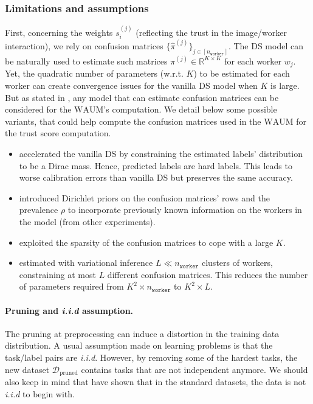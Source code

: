 \subsubsection{Limitations and assumptions}
First, concerning the weights $s_i^{(j)}$ (reflecting the trust in the image/worker interaction), we rely on confusion matrices $\{\hat{\pi}^{(j)}\}_{j\in [n_\texttt{worker}]}$.
The DS model \citep{dawid_maximum_1979} can be naturally used to estimate such matrices $\pi^{(j)}\in\mathbb{R}^{K\times K}$ for each worker $w_j$.
Yet, the quadratic number of parameters (w.r.t. $K$) to be estimated for each worker can create convergence issues for the vanilla DS model when $K$ is large.
But as stated in , any model that can estimate confusion matrices can be considered for the $\mathrm{WAUM}$'s computation.
We detail below some possible variants, that could help compute the confusion matrices used in the $\mathrm{WAUM}$ for the trust score computation.
\begin{itemize}
    \item \citet{sinha2018fast} accelerated the vanilla DS by constraining the estimated labels' distribution to be a Dirac mass. Hence, predicted labels are hard labels. This leads to worse calibration errors than vanilla DS but preserves the same accuracy.
    \item \citet{passonneau-carpenter-2014-benefits} introduced Dirichlet priors on the confusion matrices' rows and the prevalence $\rho$ to incorporate previously known information on the workers in the model (from other experiments).
    \item \citet{servajean2017crowdsourcing} exploited the sparsity of the confusion matrices to cope with a large $K$.
    \item \citet{imamura2018analysis} estimated with variational inference $L \ll n_{\texttt{worker}}$ clusters of workers, constraining at most $L$ different confusion matrices. This reduces the number of parameters required  from $K^2\times n_{\texttt{worker}}$ to $K^2\times L$.
\end{itemize}

\paragraph{Pruning and \emph{i.i.d} assumption.} The pruning at preprocessing can induce a distortion in the training data distribution.
A usual assumption made on learning problems is that the task/label pairs are \emph{i.i.d}.
However, by removing some of the hardest tasks, the new dataset $\mathcal{D}_{\text{pruned}}$ contains tasks that are not independent anymore.
We should also keep in mind that \citet{ilyas2022datamodels} have shown that in the standard datasets, the data is not \emph{i.i.d} to begin with.

